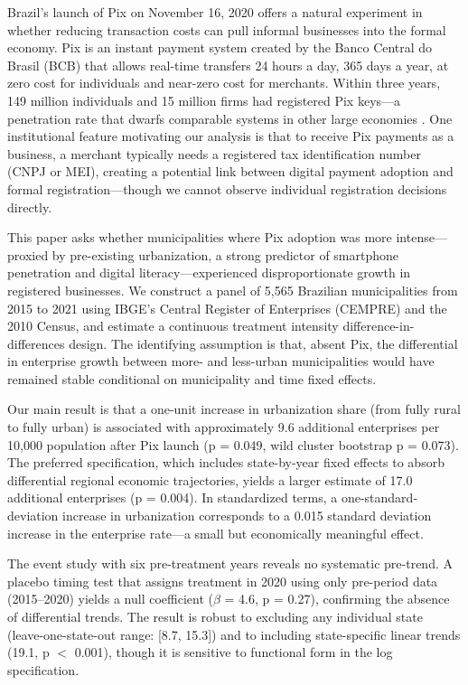 \documentclass[12pt]{article}
\begin{document}
Brazil's launch of Pix on November 16, 2020 offers a natural experiment in whether reducing transaction costs can pull informal businesses into the formal economy. Pix is an instant payment system created by the Banco Central do Brasil (BCB) that allows real-time transfers 24 hours a day, 365 days a year, at zero cost for individuals and near-zero cost for merchants. Within three years, 149 million individuals and 15 million firms had registered Pix keys---a penetration rate that dwarfs comparable systems in other large economies \citep{bcb2023pix}. One institutional feature motivating our analysis is that to receive Pix payments as a business, a merchant typically needs a registered tax identification number (CNPJ or MEI), creating a potential link between digital payment adoption and formal registration---though we cannot observe individual registration decisions directly.

This paper asks whether municipalities where Pix adoption was more intense---proxied by pre-existing urbanization, a strong predictor of smartphone penetration and digital literacy---experienced disproportionate growth in registered businesses. We construct a panel of 5,565 Brazilian municipalities from 2015 to 2021 using IBGE's Central Register of Enterprises (CEMPRE) and the 2010 Census, and estimate a continuous treatment intensity difference-in-differences design. The identifying assumption is that, absent Pix, the differential in enterprise growth between more- and less-urban municipalities would have remained stable conditional on municipality and time fixed effects.

Our main result is that a one-unit increase in urbanization share (from fully rural to fully urban) is associated with approximately 9.6 additional enterprises per 10,000 population after Pix launch (p = 0.049, wild cluster bootstrap p = 0.073). The preferred specification, which includes state-by-year fixed effects to absorb differential regional economic trajectories, yields a larger estimate of 17.0 additional enterprises (p = 0.004). In standardized terms, a one-standard-deviation increase in urbanization corresponds to a 0.015 standard deviation increase in the enterprise rate---a small but economically meaningful effect.

The event study with six pre-treatment years reveals no systematic pre-trend. A placebo timing test that assigns treatment in 2020 using only pre-period data (2015--2020) yields a null coefficient ($\beta$ = 4.6, p = 0.27), confirming the absence of differential trends. The result is robust to excluding any individual state (leave-one-state-out range: [8.7, 15.3]) and to including state-specific linear trends (19.1, p $<$ 0.001), though it is sensitive to functional form in the log specification.
\end{document}
